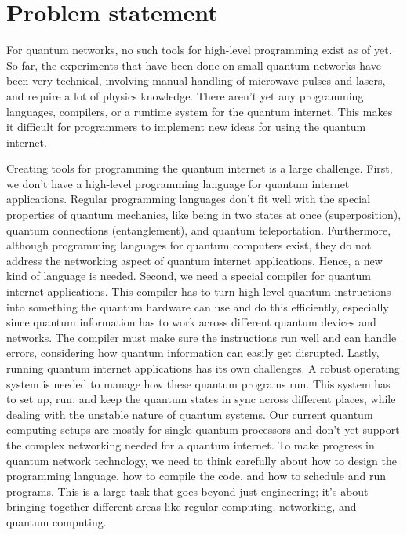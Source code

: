 \section{Problem statement}
For quantum networks, no such tools for high-level programming exist as of yet.
So far, the experiments that have been done on small quantum networks have been very technical, involving manual handling of microwave pulses and lasers, and require a lot of physics knowledge.
There aren't yet any programming languages, compilers, or a runtime system for the quantum internet.
This makes it difficult for programmers to implement new ideas for using the quantum internet.

Creating tools for programming the quantum internet is a large challenge.
First, we don't have a high-level programming language for quantum internet applications.
Regular programming languages don't fit well with the special properties of quantum mechanics, like being in two states at once (superposition), quantum connections (entanglement), and quantum teleportation. Furthermore, although programming languages for quantum computers exist, they do not address the networking aspect of quantum internet applications.
Hence, a new kind of language is needed.
Second, we need a special compiler for quantum internet applications.
This compiler has to turn high-level quantum instructions into something the quantum hardware can use and do this efficiently, especially since quantum information has to work across different quantum devices and networks.
The compiler must make sure the instructions run well and can handle errors, considering how quantum information can easily get disrupted.
Lastly, running quantum internet applications has its own challenges.
A robust operating system is needed to manage how these quantum programs run.
This system has to set up, run, and keep the quantum states in sync across different places, while dealing with the unstable nature of quantum systems.
Our current quantum computing setups are mostly for single quantum processors and don't yet support the complex networking needed for a quantum internet.
To make progress in quantum network technology, we need to think carefully about how to design the programming language, how to compile the code, and how to schedule and run programs.
This is a large task that goes beyond just engineering; it's about bringing together different areas like regular computing, networking, and quantum computing.





